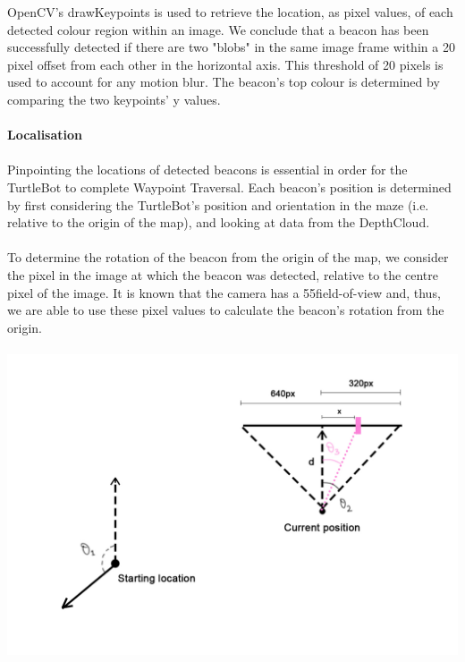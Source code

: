 \documentclass[titlepage,12pt,a4paper]{article}
\begin{document}
\noindent
OpenCV's drawKeypoints is used to retrieve the location, as pixel values, of each detected colour region within an image. We conclude that a beacon has been successfully detected if there are two "blobs" in the same image frame within a 20 pixel offset from each other in the horizontal axis. This threshold of 20 pixels is used to account for any motion blur. The beacon's top colour is determined by comparing the two keypoints' y values.\\
\\
\large{\textbf{Localisation}} \\
\normalsize
\\
Pinpointing the locations of detected beacons is essential in order for the TurtleBot to complete Waypoint Traversal. Each beacon's position is determined by first considering the TurtleBot's position and orientation in the maze (i.e. relative to the origin of the map), and looking at data from the DepthCloud. \\
\\
To determine the rotation of the beacon from the origin of the map, we consider the pixel in the image at which the beacon was detected, relative to the centre pixel of the image. It is known that the camera has a 55\degree field-of-view and, thus, we are able to use these pixel values to calculate the beacon's rotation from the origin. \\
\\
\includegraphics[scale=0.3]{beacon.jpg}
\end{document}

